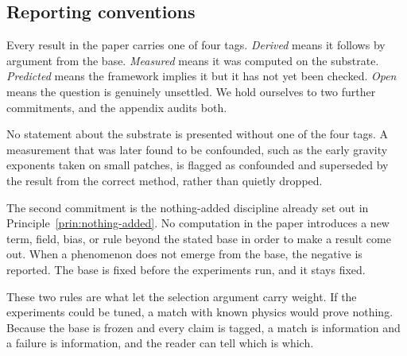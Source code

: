 \subsection{Reporting conventions}

Every result in the paper carries one of four tags. \emph{Derived} means it follows by argument from the base.
\emph{Measured} means it was computed on the substrate. \emph{Predicted} means the framework implies it but it has
not yet been checked. \emph{Open} means the question is genuinely unsettled. We hold ourselves to two further
commitments, and the appendix audits both.

\begin{principle}
No statement about the substrate is presented without one of the four tags. A measurement that was later found to
be confounded, such as the early gravity exponents taken on small patches, is flagged as confounded and
superseded by the result from the correct method, rather than quietly dropped.
\end{principle}

The second commitment is the nothing-added discipline already set out in Principle~\ref{prin:nothing-added}. No
computation in the paper introduces a new term, field, bias, or rule beyond the stated base in order to make a
result come out. When a phenomenon does not emerge from the base, the negative is reported. The base is fixed
before the experiments run, and it stays fixed.

These two rules are what let the selection argument carry weight. If the experiments could be tuned, a match
with known physics would prove nothing. Because the base is frozen and every claim is tagged, a match is
information and a failure is information, and the reader can tell which is which.
